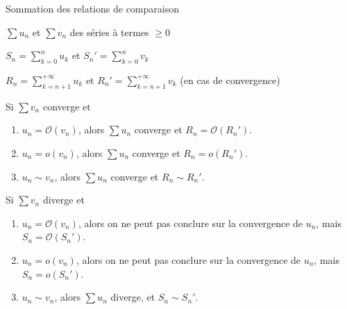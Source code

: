     \begin{prop}{Sommation des relations de comparaison}{}
        \begin{soient}
            \item $\sum u_n$ et $\sum v_n$ des séries à termes $\geq 0$
            \item $S_n = \sum_{k=0}^n u_k$ et $S_n' = \sum_{k=0}^n v_k$
            \item $R_n = \sum_{k=n+1}^{+\infty} u_k$ et $R_n' = \sum_{k=n+1}^{+\infty} v_k$ (en cas de convergence)
        \end{soient}
        \begin{alors}
            \item Si $\sum v_n$ converge et \begin{enumerate}[label=(\alph*)]
                \item $u_n = \mathcal{O}(v_n)$, alors $\sum u_n$ converge et $R_n = \mathcal{O}(R_n')$.
                \item $u_n = o(v_n)$, alors $\sum u_n$ converge et $R_n = o(R_n')$.
                \item $u_n \sim v_n$, alors $\sum u_n$ converge et $R_n \sim R_n'$.
            \end{enumerate}
            \item Si $\sum v_n$ diverge et \begin{enumerate}[label=(\alph*)]
                \item $u_n = \mathcal{O}(v_n)$, alors on ne peut pas conclure sur la convergence de $u_n$, mais $S_n = \mathcal{O}(S_n')$.
                \item $u_n = o(v_n)$, alors on ne peut pas conclure sur la convergence de $u_n$, mais $S_n = o(S_n')$.
                \item $u_n \sim v_n$, alors $\sum u_n$ diverge, et $S_n \sim S_n'$.
            \end{enumerate}
        \end{alors}
    \end{prop}

